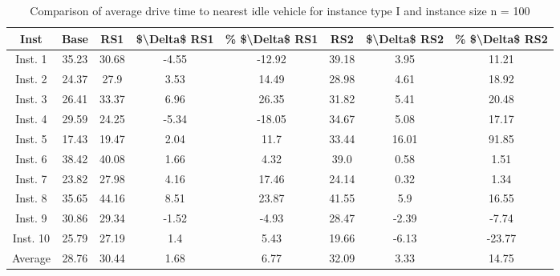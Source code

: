 \begin{table}[H]
\centering
\begin{tabular}{cccccccc}
  \hline
  \textbf{Inst} & \textbf{Base} & \textbf{RS1} & \textbf{\$\textbackslash{}Delta\$  RS1} & \textbf{\% \$\textbackslash{}Delta\$  RS1} & \textbf{RS2} & \textbf{\$\textbackslash{}Delta\$  RS2} & \textbf{\% \$\textbackslash{}Delta\$  RS2} \\\hline
  Inst. 1 & 35.23 & 30.68 & -4.55 & -12.92 & 39.18 & 3.95 & 11.21 \\
  Inst. 2 & 24.37 & 27.9 & 3.53 & 14.49 & 28.98 & 4.61 & 18.92 \\
  Inst. 3 & 26.41 & 33.37 & 6.96 & 26.35 & 31.82 & 5.41 & 20.48 \\
  Inst. 4 & 29.59 & 24.25 & -5.34 & -18.05 & 34.67 & 5.08 & 17.17 \\
  Inst. 5 & 17.43 & 19.47 & 2.04 & 11.7 & 33.44 & 16.01 & 91.85 \\
  Inst. 6 & 38.42 & 40.08 & 1.66 & 4.32 & 39.0 & 0.58 & 1.51 \\
  Inst. 7 & 23.82 & 27.98 & 4.16 & 17.46 & 24.14 & 0.32 & 1.34 \\
  Inst. 8 & 35.65 & 44.16 & 8.51 & 23.87 & 41.55 & 5.9 & 16.55 \\
  Inst. 9 & 30.86 & 29.34 & -1.52 & -4.93 & 28.47 & -2.39 & -7.74 \\
  Inst. 10 & 25.79 & 27.19 & 1.4 & 5.43 & 19.66 & -6.13 & -23.77 \\
  Average & 28.76 & 30.44 & 1.68 & 6.77 & 32.09 & 3.33 & 14.75 \\\hline
\end{tabular}
\caption{Comparison of average drive time to nearest idle vehicle for instance type I and instance size n = 100}
\label{tab:wait:resrelocation-nearest-drive-time-comparison_I_100}
\end{table}

